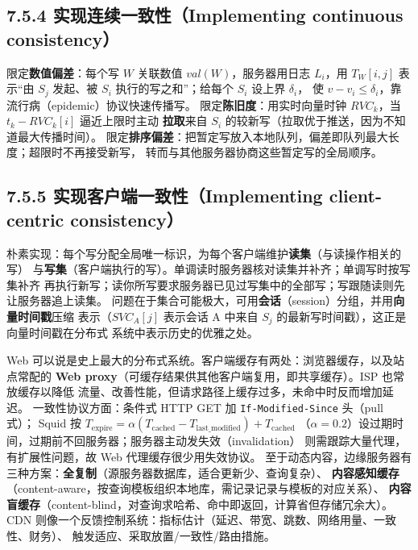 
\subsection*{7.5.4 实现连续一致性（Implementing continuous consistency）}
限定\textbf{数值偏差}：每个写 $W$ 关联数值 $val(W)$，服务器用日志 $L_i$，用
$T_W[i,j]$ 表示“由 $S_j$ 发起、被 $S_i$ 执行的写之和”；给每个 $S_i$ 设上界 $\delta_i$，
使 $v - v_i \le \delta_i$，靠流行病（epidemic）协议快速传播写。
限定\textbf{陈旧度}：用实时向量时钟 $RVC_k$，当 $t_k - RVC_k[i]$ 逼近上限时主动
\textbf{拉取}来自 $S_i$ 的较新写（拉取优于推送，因为不知道最大传播时间）。
限定\textbf{排序偏差}：把暂定写放入本地队列，偏差即队列最大长度；超限时不再接受新写，
转而与其他服务器协商这些暂定写的全局顺序。


\subsection*{7.5.5 实现客户端一致性（Implementing client-centric consistency）}
朴素实现：每个写分配全局唯一标识，为每个客户端维护\textbf{读集}（与读操作相关的写）
与\textbf{写集}（客户端执行的写）。单调读时服务器核对读集并补齐；单调写时按写集补齐
再执行新写；读你所写要求服务器已见过写集中的全部写；写跟随读则先让服务器追上读集。
问题在于集合可能极大，可用\textbf{会话}（session）分组，并用\textbf{向量时间戳}压缩
表示（$SVC_A[j]$ 表示会话 A 中来自 $S_j$ 的最新写时间戳），这正是向量时间戳在分布式
系统中表示历史的优雅之处。

\begin{closeread}
\end{closeread}



Web 可以说是史上最大的分布式系统。客户端缓存有两处：浏览器缓存，以及站点常配的
\textbf{Web proxy}（可缓存结果供其他客户端复用，即共享缓存）。ISP 也常放缓存以降低
流量、改善性能，但请求路径上缓存过多，未命中时反而增加延迟。
一致性协议方面：条件式 HTTP GET 加 \texttt{If-Modified-Since} 头（pull 式）；
Squid 按
$T_{\text{expire}} = \alpha(T_{\text{cached}} - T_{\text{last\_modified}}) + T_{\text{cached}}$
（$\alpha = 0.2$）设过期时间，过期前不回服务器；服务器主动发失效（invalidation）
则需跟踪大量代理，有扩展性问题，故 Web 代理缓存很少用失效协议。
至于动态内容，边缘服务器有三种方案：\textbf{全复制}（源服务器数据库，适合更新少、查询复杂）、
\textbf{内容感知缓存}（content-aware，按查询模板组织本地库，需记录记录与模板的对应关系）、
\textbf{内容盲缓存}（content-blind，对查询求哈希、命中即返回，计算省但存储冗余大）。
CDN 则像一个反馈控制系统：指标估计（延迟、带宽、跳数、网络用量、一致性、财务）、
触发适应、采取放置/一致性/路由措施。

